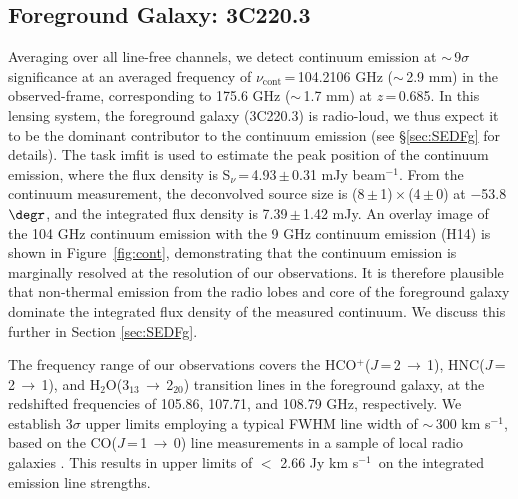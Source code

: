 \documentclass[iop]{emulateapj}
\newcommand{\rarr}{$\rightarrow$}
\newcommand{\pmOne}{\mbox{$^{-1}$}}
\begin{document}
\subsection{Foreground Galaxy: 3C220.3}
Averaging over all line-free channels, we detect continuum emission at $\sim$\,9$\sigma$ significance at an averaged frequency of $\nu_\textrm{cont}$\,=\,104.2106 GHz ($\sim$\,2.9 mm) in the observed-frame, corresponding to 175.6 GHz ($\sim$\,1.7 mm) at $z$\,=\,0.685. In this lensing system, the
foreground galaxy (3C220.3) is radio-loud, we thus expect it to be the dominant contributor to the continuum emission (see \S \ref{sec:SEDFg} for details). The task {\sc imfit} is used to estimate the peak position of the continuum emission, where the flux density is S$_\nu$\,=\,4.93\,$\pm$\,0.31\,\,mJy\,\,beam\pmOne. From the continuum measurement, the deconvolved source size
is (8\,$\pm$\,1)\,$\times$\,(4\,$\pm$\,0) at $-$53.8$\degr$, and the integrated flux density is 7.39\,$\pm$\,1.42\,\,mJy. An overlay image of the 104 GHz
continuum emission with the 9 GHz continuum emission (H14) is shown in Figure~\ref{fig:cont}, demonstrating that the continuum
emission is marginally resolved at the resolution of our observations. It is therefore plausible that non-thermal emission from the radio lobes and core of the foreground galaxy dominate the integrated flux
density of the measured continuum. We discuss this further in Section \ref{sec:SEDFg}. \par
The frequency range of our observations covers the HCO$^+$($J$\,=\,2\,\rarr\,1), HNC($J$\,=\,2\,$\rightarrow$\,1), and H$_2$O(3$_{13}$\,\rarr\,2$_{20}$)
transition lines in the foreground galaxy, at
the redshifted frequencies of 105.86, 107.71, and 108.79\,\,GHz, respectively. We establish 3$\sigma$ upper limits employing a typical FWHM line width of
$\sim$\,300\,\,km\,\,s\pmOne, based on the CO($J$\,=\,1\,$\rightarrow$\,0) line measurements in a sample of local radio galaxies \citep[$z$ $<$ 0.1; ][]{Smolcic11a}. This results in upper limits of $<$ 2.66\,\,Jy\,\,km\,\,s\pmOne\ on the integrated emission line strengths.
\end{document}
